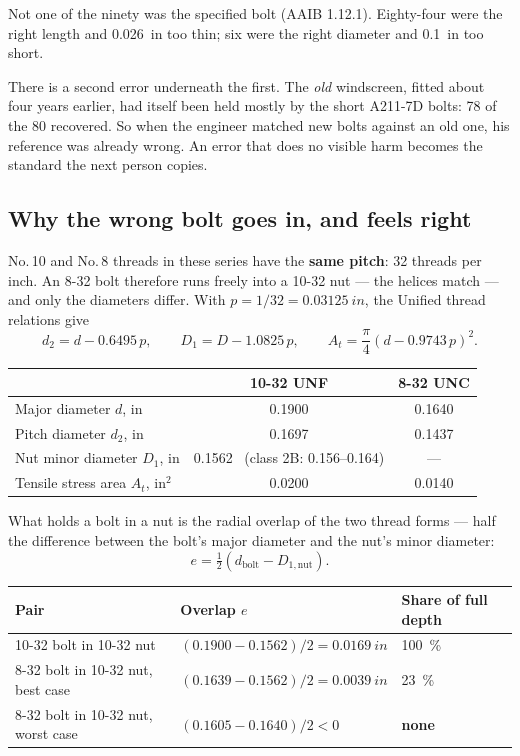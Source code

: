 \documentclass[11pt,a4paper]{article}
\begin{document}
\noindent Not one of the ninety was the specified bolt (AAIB 1.12.1). Eighty-four were the right
length and \SI{0.026}{in} too thin; six were the right diameter and \SI{0.1}{in} too short.

\medskip
There is a second error underneath the first. The \emph{old} windscreen, fitted about four years
earlier, had itself been held mostly by the short A211-7D bolts: 78 of the 80 recovered. So when
the engineer matched new bolts against an old one, his reference was already wrong. An error that
does no visible harm becomes the standard the next person copies.

\subsection*{Why the wrong bolt goes in, and feels right}

No.\,10 and No.\,8 threads in these series have the \textbf{same pitch}: 32 threads per inch. An
8-32 bolt therefore runs freely into a 10-32 nut --- the helices match --- and only the diameters
differ. With $p=1/32=\SI{0.03125}{in}$, the Unified thread relations give
\[
d_2 = d-0.6495\,p,\qquad D_1 = D-1.0825\,p,\qquad A_t=\frac{\pi}{4}\left(d-0.9743\,p\right)^2 .
\]

\begin{center}\small
\begin{tabular}{@{}lcc@{}}
\toprule
 & 10-32 UNF & 8-32 UNC\\
\midrule
Major diameter $d$, in & 0.1900 & 0.1640\\
Pitch diameter $d_2$, in & 0.1697 & 0.1437\\
Nut minor diameter $D_1$, in & 0.1562 \ (class 2B: 0.156--0.164) & ---\\
Tensile stress area $A_t$, in$^2$ & 0.0200 & 0.0140\\
\bottomrule
\end{tabular}
\end{center}

What holds a bolt in a nut is the radial overlap of the two thread forms --- half the difference
between the bolt's major diameter and the nut's minor diameter:
\[
e=\tfrac12\left(d_{\text{bolt}}-D_{1,\text{nut}}\right).
\]

\begin{center}\small
\begin{tabular}{@{}lll@{}}
\toprule
Pair & Overlap $e$ & Share of full depth\\
\midrule
10-32 bolt in 10-32 nut & $(0.1900-0.1562)/2=\SI{0.0169}{in}$ & \SI{100}{\percent}\\
8-32 bolt in 10-32 nut, best case & $(0.1639-0.1562)/2=\SI{0.0039}{in}$ & \SI{23}{\percent}\\
8-32 bolt in 10-32 nut, worst case & $(0.1605-0.1640)/2<0$ & \textbf{none}\\
\bottomrule
\end{tabular}
\end{center}
\end{document}

